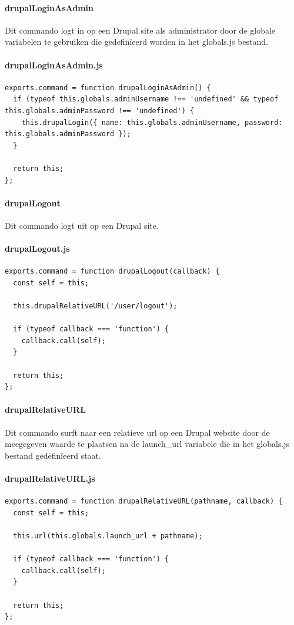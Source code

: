 \clearpage
\paragraph{drupalLoginAsAdmin}
\label{commando28}
Dit commando logt in op een Drupal site als administrator door de globale variabelen te gebruiken die gedefinïeerd worden in het globals.js bestand.
\paragraph{drupalLoginAsAdmin.js}
\begin{lstlisting}[breaklines=true]
exports.command = function drupalLoginAsAdmin() {
  if (typeof this.globals.adminUsername !== 'undefined' && typeof this.globals.adminPassword !== 'undefined') {
    this.drupalLogin({ name: this.globals.adminUsername, password: this.globals.adminPassword });
  }

  return this;
};
\end{lstlisting}


\clearpage
\paragraph{drupalLogout}
\label{commando29}
Dit commando logt uit op een Drupal site.
\paragraph{drupalLogout.js}
\begin{lstlisting}[breaklines=true]
exports.command = function drupalLogout(callback) {
  const self = this;

  this.drupalRelativeURL('/user/logout');

  if (typeof callback === 'function') {
    callback.call(self);
  }

  return this;
};
\end{lstlisting}


\clearpage
\paragraph{drupalRelativeURL}
\label{commando30}
Dit commando surft naar een relatieve url op een Drupal website door de meegegeven waarde te plaatsen na de launch\_url variabele die in het globals.js bestand gedefinïeerd staat.
\paragraph{drupalRelativeURL.js}
\begin{lstlisting}[breaklines=true]
exports.command = function drupalRelativeURL(pathname, callback) {
  const self = this;

  this.url(this.globals.launch_url + pathname);

  if (typeof callback === 'function') {
    callback.call(self);
  }

  return this;
};
\end{lstlisting}


